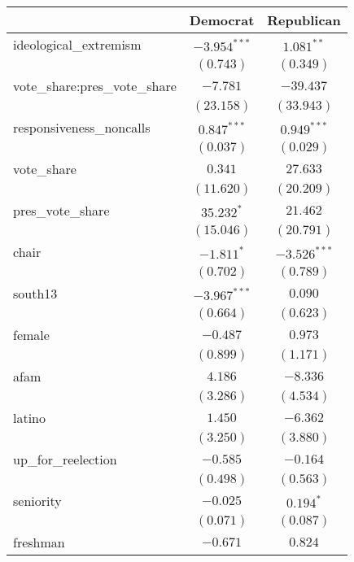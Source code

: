 \documentclass[12pt]{article}
\begin{document}
\begin{table}
	\begin{center}
		\begin{tabular}{l c c }
			\hline
			& Democrat & Republican \\
			\hline
			ideological\_extremism        & $-3.954^{***}$ & $1.081^{**}$   \\
			& $(0.743)$      & $(0.349)$      \\
			vote\_share:pres\_vote\_share & $-7.781$       & $-39.437$      \\
			& $(23.158)$     & $(33.943)$     \\
			responsiveness\_noncalls      & $0.847^{***}$  & $0.949^{***}$  \\
			& $(0.037)$      & $(0.029)$      \\
			vote\_share                   & $0.341$        & $27.633$       \\
			& $(11.620)$     & $(20.209)$     \\
			pres\_vote\_share             & $35.232^{*}$   & $21.462$       \\
			& $(15.046)$     & $(20.791)$     \\
			chair                         & $-1.811^{*}$   & $-3.526^{***}$ \\
			& $(0.702)$      & $(0.789)$      \\
			south13                       & $-3.967^{***}$ & $0.090$        \\
			& $(0.664)$      & $(0.623)$      \\
			female                        & $-0.487$       & $0.973$        \\
			& $(0.899)$      & $(1.171)$      \\
			afam                          & $4.186$        & $-8.336$       \\
			& $(3.286)$      & $(4.534)$      \\
			latino                        & $1.450$        & $-6.362$       \\
			& $(3.250)$      & $(3.880)$      \\
			up\_for\_reelection           & $-0.585$       & $-0.164$       \\
			& $(0.498)$      & $(0.563)$      \\
			seniority                     & $-0.025$       & $0.194^{*}$    \\
			& $(0.071)$      & $(0.087)$      \\
			freshman                      & $-0.671$       & $0.824$        \\

\end{tabular}
\end{center}
\end{table}
\end{document}
